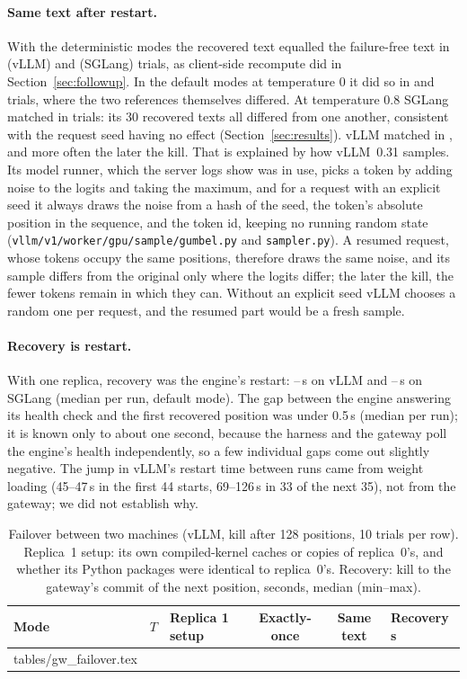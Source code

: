 \documentclass[10pt,twocolumn]{article}
\makeatletter
\def\GwFailoverRows{\@@input tables/gw_failover.tex }
\makeatother
\begin{document}
\paragraph{Same text after restart.} With the deterministic modes the
recovered text equalled the failure-free text in \GwDetSameVllm{} (vLLM) and
\GwDetSameSglang{} (SGLang) trials, as client-side recompute did in
Section~\ref{sec:followup}. In the default modes at temperature 0 it did so
in \GwDefaultZeroSameVllm{} and \GwDefaultZeroSameSglang{} trials, where the
two references themselves differed. At temperature 0.8 SGLang matched in
\GwDefaultHotSameSglang{} trials: its 30 recovered texts all differed from
one another, consistent with the request seed having no effect
(Section~\ref{sec:results}). vLLM matched in \GwDefaultHotSameVllm{}, and more
often the later the kill. That is explained by how vLLM~0.31 samples. Its
model runner, which the server logs show was in use, picks a token by adding
noise to the logits and taking the maximum, and for a request with an
explicit seed it always draws the noise from a hash of the seed, the token's
absolute position in the sequence, and the token id, keeping no running
random state (\texttt{vllm/v1/worker/gpu/sample/gumbel.py} and
\texttt{sampler.py}). A resumed request, whose tokens occupy the same
positions, therefore draws the same noise, and its sample differs from the
original only where the logits differ; the later the kill, the fewer tokens
remain in which they can. Without an explicit seed vLLM chooses a random one
per request, and the resumed part would be a fresh sample.

\paragraph{Recovery is restart.} With one replica, recovery was the engine's
restart: \GwRestartMinVllm--\GwRestartMaxVllm\,s on vLLM and
\GwRestartMinSglang--\GwRestartMaxSglang\,s on SGLang (median per run, default
mode). The gap between the engine answering its health check and the first
recovered position was under 0.5\,s (median per run); it is known only to
about one second, because the harness and the gateway poll the engine's
health independently, so a few individual gaps come out slightly negative. The jump in vLLM's restart time between runs came from weight
loading (45--47\,s in the first 44 starts, 69--126\,s in 33 of the next 35),
not from the gateway; we did not establish why.

\begin{table}[t]
\centering\small
\caption{Failover between two machines (vLLM, kill after 128 positions, 10
trials per row). Replica~1 setup: its own compiled-kernel caches or copies of
replica~0's, and whether its Python packages were identical to replica~0's.
Recovery: kill to the gateway's commit of the next position, seconds, median
(min--max).}
\label{tab:gwfailover}
\begin{tabular}{@{}lrlccl@{}}
\toprule
Mode & $T$ & Replica 1 setup & Exactly-once & Same text & Recovery s \\
\midrule
\GwFailoverRows
\bottomrule
\end{tabular}
\end{table}
\end{document}
